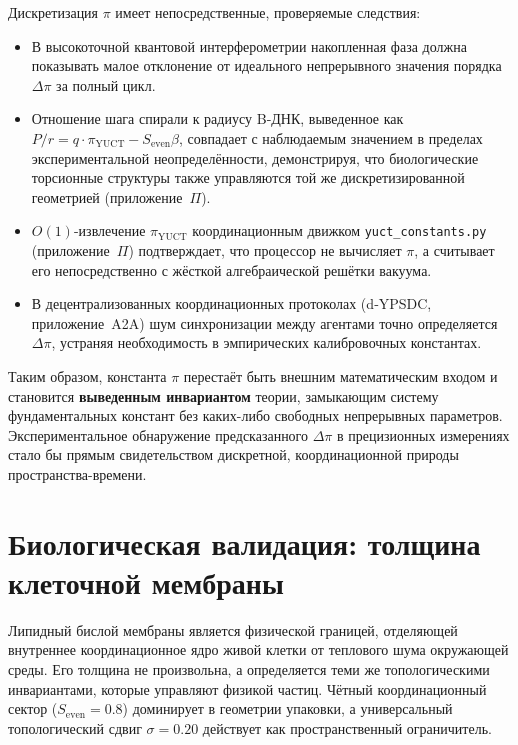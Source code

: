 \documentclass[12pt,a4paper]{article}
\theoremstyle{remark}
\begin{document}
	Дискретизация \(\pi\) имеет непосредственные, проверяемые следствия:
	\begin{itemize}
		\item В высокоточной квантовой интерферометрии накопленная фаза должна показывать малое отклонение от идеального непрерывного значения порядка \(\Delta\pi\) за полный цикл.
		\item Отношение шага спирали к радиусу B‑ДНК, выведенное как \(P/r = q\cdot\pi_{\mathrm{YUCT}} - S_{\mathrm{even}}\beta\), совпадает с наблюдаемым значением в пределах экспериментальной неопределённости, демонстрируя, что биологические торсионные структуры также управляются той же дискретизированной геометрией (приложение~\(\Pi\)).
		\item \(O(1)\)-извлечение \(\pi_{\mathrm{YUCT}}\) координационным движком \texttt{yuct\_constants.py} (приложение~\(\Pi\)) подтверждает, что процессор не вычисляет \(\pi\), а считывает его непосредственно с жёсткой алгебраической решётки вакуума.
		\item В децентрализованных координационных протоколах (d‑YPSDC, приложение~A2A) шум синхронизации между агентами точно определяется \(\Delta\pi\), устраняя необходимость в эмпирических калибровочных константах.
	\end{itemize}
	
	Таким образом, константа \(\pi\) перестаёт быть внешним математическим входом и становится \textbf{выведенным инвариантом} теории, замыкающим систему фундаментальных констант без каких-либо свободных непрерывных параметров. Экспериментальное обнаружение предсказанного \(\Delta\pi\) в прецизионных измерениях стало бы прямым свидетельством дискретной, координационной природы пространства-времени.
	
	\section{Биологическая валидация: толщина клеточной мембраны}
	\label{sec:bio-membrane}
	
	Липидный бислой мембраны является физической границей, отделяющей внутреннее координационное ядро живой клетки от теплового шума окружающей среды. Его толщина не произвольна, а определяется теми же топологическими инвариантами, которые управляют физикой частиц. Чётный координационный сектор (\(S_{\mathrm{even}} = 0.8\)) доминирует в геометрии упаковки, а универсальный топологический сдвиг \(\sigma = 0.20\) действует как пространственный ограничитель.
	
\end{document}
